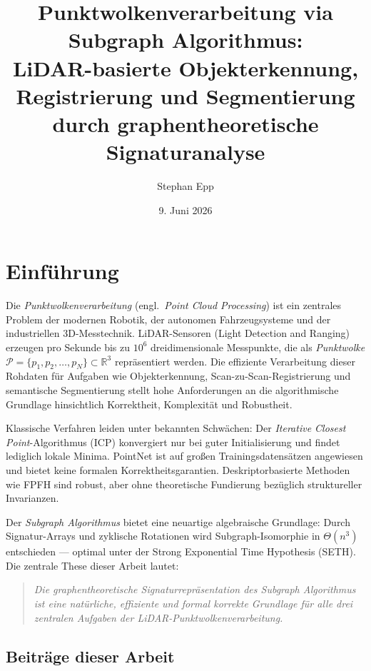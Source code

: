 ﻿\documentclass[a4paper,12pt]{article}
\title{\textbf{Punktwolkenverarbeitung via Subgraph Algorithmus:\\
LiDAR-basierte Objekterkennung, Registrierung und Segmentierung\\
durch graphentheoretische Signaturanalyse}}
\author{Stephan Epp}
\date{9. Juni 2026}
\theoremstyle{definition}
\begin{document}
\maketitle
\tableofcontents
\newpage

\section{Einführung}

Die \emph{Punktwolkenverarbeitung} (engl.\ \emph{Point Cloud Processing})
ist ein zentrales Problem der modernen Robotik, der autonomen Fahrzeugsysteme
und der industriellen 3D-Messtechnik. LiDAR-Sensoren (Light Detection and
Ranging) erzeugen pro Sekunde bis zu $10^6$ dreidimensionale Messpunkte,
die als \emph{Punktwolke} $\mathcal{P} = \{p_1, p_2, \ldots, p_N\} \subset
\mathbb{R}^3$ repräsentiert werden. Die effiziente Verarbeitung dieser
Rohdaten für Aufgaben wie Objekterkennung, Scan-zu-Scan-Registrierung und
semantische Segmentierung stellt hohe Anforderungen an die algorithmische
Grundlage hinsichtlich Korrektheit, Komplexität und Robustheit.

Klassische Verfahren leiden unter bekannten Schwächen: Der
\emph{Iterative Closest Point}-Algorithmus (ICP) \citep{Besl1992}
konvergiert nur bei guter Initialisierung und findet lediglich lokale
Minima. PointNet \citep{Qi2017} ist auf großen Trainingsdatensätzen
angewiesen und bietet keine formalen Korrektheitsgarantien.
Deskriptorbasierte Methoden wie FPFH \citep{Rusu2009} sind robust, aber
ohne theoretische Fundierung bezüglich struktureller Invarianzen.

Der \emph{Subgraph Algorithmus} \citep{Epp2026} bietet eine neuartige
algebraische Grundlage: Durch Signatur-Arrays und zyklische Rotationen
wird Subgraph-Isomorphie in $\Theta(n^3)$ entschieden --- optimal unter
der Strong Exponential Time Hypothesis (SETH). Die zentrale These dieser
Arbeit lautet:

\begin{quote}
  \emph{Die graphentheoretische Signaturrepräsentation des Subgraph
  Algorithmus ist eine natürliche, effiziente und formal korrekte
  Grundlage für alle drei zentralen Aufgaben der
  LiDAR-Punktwolkenverarbeitung.}
\end{quote}

\subsection{Beiträge dieser Arbeit}
\end{document}
